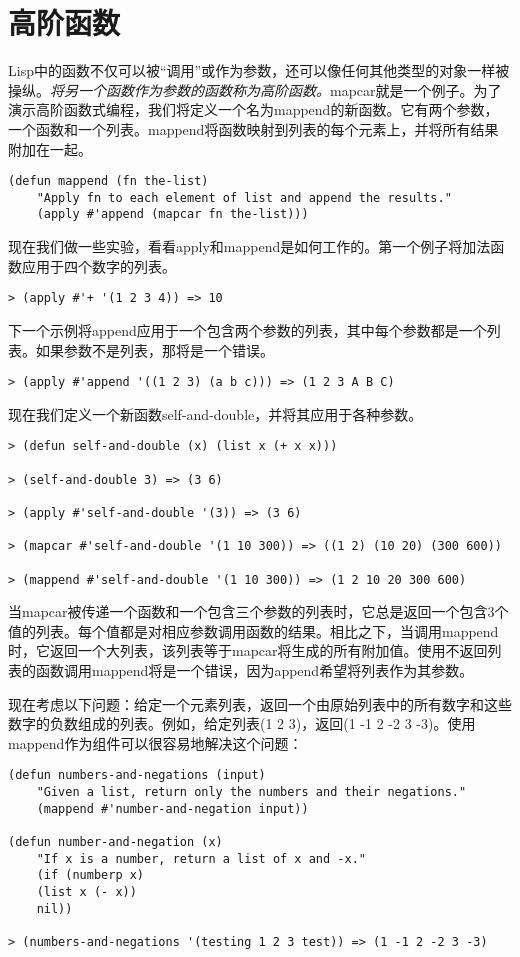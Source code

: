 \section{高阶函数}
Lisp中的函数不仅可以被“调用”或作为参数，还可以像任何其他类型的对象一样被操纵。\emph{将另一个函数作为参数的函数称为高阶函数。}mapcar就是一个例子。为了演示高阶函数式编程，我们将定义一个名为mappend的新函数。它有两个参数，一个函数和一个列表。mappend将函数映射到列表的每个元素上，并将所有结果附加在一起。

\begin{lstlisting}[frame=shadowbox]
(defun mappend (fn the-list)
	"Apply fn to each element of list and append the results."
	(apply #'append (mapcar fn the-list)))
\end{lstlisting}

现在我们做一些实验，看看apply和mappend是如何工作的。第一个例子将加法函数应用于四个数字的列表。
\begin{lstlisting}[frame=shadowbox]
> (apply #'+ '(1 2 3 4)) => 10
\end{lstlisting}

下一个示例将append应用于一个包含两个参数的列表，其中每个参数都是一个列表。如果参数不是列表，那将是一个错误。
\begin{lstlisting}[frame=shadowbox]
> (apply #'append '((1 2 3) (a b c))) => (1 2 3 A B C)
\end{lstlisting}

现在我们定义一个新函数self-and-double，并将其应用于各种参数。
\begin{lstlisting}[frame=shadowbox]
> (defun self-and-double (x) (list x (+ x x)))

> (self-and-double 3) => (3 6)

> (apply #'self-and-double '(3)) => (3 6)

> (mapcar #'self-and-double '(1 10 300)) => ((1 2) (10 20) (300 600))

> (mappend #'self-and-double '(1 10 300)) => (1 2 10 20 300 600)
\end{lstlisting}
当mapcar被传递一个函数和一个包含三个参数的列表时，它总是返回一个包含3个值的列表。每个值都是对相应参数调用函数的结果。相比之下，当调用mappend时，它返回一个大列表，该列表等于mapcar将生成的所有附加值。使用不返回列表的函数调用mappend将是一个错误，因为append希望将列表作为其参数。

现在考虑以下问题：给定一个元素列表，返回一个由原始列表中的所有数字和这些数字的负数组成的列表。例如，给定列表(1 2 3)，返回(1 -1 2 -2 3 -3)。使用mappend作为组件可以很容易地解决这个问题：
\begin{lstlisting}[frame=shadowbox]
(defun numbers-and-negations (input)
	"Given a list, return only the numbers and their negations."
	(mappend #'number-and-negation input))

(defun number-and-negation (x)
	"If x is a number, return a list of x and -x."
	(if (numberp x)
	(list x (- x))
	nil))

> (numbers-and-negations '(testing 1 2 3 test)) => (1 -1 2 -2 3 -3)
\end{lstlisting}

